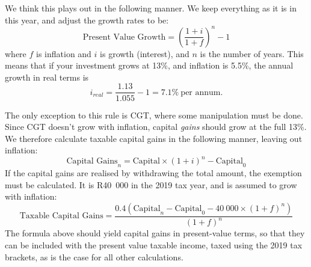 \documentclass[a4paper, justified]{tufte-handout}
\begin{document}
We think this plays out in the following manner. We keep everything as it is in this year, and adjust the growth rates to be:
\begin{equation}
\textrm{Present Value Growth} = \left(\frac{1+i}{1+f}\right)^n - 1
\end{equation}
where $f$ is inflation and $i$ is growth (interest), and $n$ is the number of years. This means that if your investment grows at 13\%, and inflation is 5.5\%, the annual growth in real terms is 
\begin{equation}
i_{real} = \frac{1.13}{1.055} - 1=7.1\%~\textrm{per annum.}
\end{equation}

The only exception to this rule is CGT, where some manipulation must be done. Since CGT doesn't grow with inflation, capital \textit{gains} should grow at the full 13\%. We therefore calculate taxable capital gains in the following manner, leaving out inflation:
\begin{equation}
\textrm{Capital Gains}_{n} = \textrm{Capital}\times(1+i)^{n} - \textrm{Capital}_0
\end{equation}
If the capital gains are realised by withdrawing the total amount, the exemption must be calculated. It is R40~000 in the 2019 tax year, and is assumed to grow with inflation:
\begin{equation}
\textrm{Taxable Capital Gains} = \frac{0.4\left(\textrm{Capital}_{n} - \textrm{Capital}_{0} - 40~000\times(1+f)^{n}\right)}{(1+f)^n}
\end{equation}
The formula above should yield capital gains in present-value terms, so that they can be included with the present value taxable income, taxed using the 2019 tax brackets, as is the case for all other calculations.

\newpage
\end{document}
